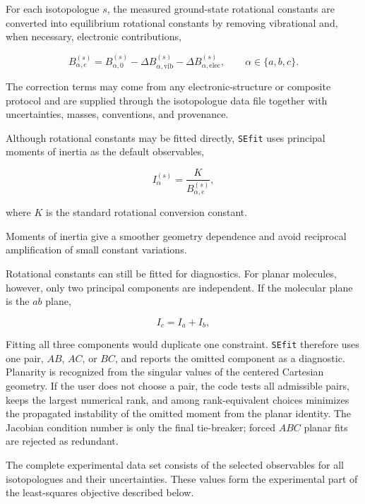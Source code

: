 \documentclass[journal=jctcce,manuscript=article,maxauthors=999]{achemso}
\begin{document}
For each isotopologue $s$, the measured ground-state rotational constants are
converted into equilibrium rotational constants by removing vibrational and,
when necessary, electronic contributions,\cite{Costain1958,Pawlowski2002,Piccardo2015B3LYP,Penocchio2015B2PLYP}

\begin{equation}
B_{\alpha,e}^{(s)}
= B_{\alpha,0}^{(s)}
- \Delta B_{\alpha,\mathrm{vib}}^{(s)}
- \Delta B_{\alpha,\mathrm{elec}}^{(s)},
\qquad
\alpha \in \{a,b,c\}.
\end{equation}

The correction terms may come from any electronic-structure or composite
protocol and are supplied through the isotopologue data file together with
uncertainties, masses, conventions, and provenance.\cite{Mendolicchio2025FastDvib}

Although rotational constants may be fitted directly, \texttt{SEfit} uses
principal moments of inertia as the default observables,

\begin{equation}
I_{\alpha}^{(s)}
=
\frac{K}
{B_{\alpha,e}^{(s)}},
\end{equation}

where $K$ is the standard rotational conversion constant.

Moments of inertia give a smoother geometry dependence and avoid reciprocal
amplification of small constant variations.

Rotational constants can still be fitted for diagnostics. For planar
molecules, however, only two principal components are independent. If the
molecular plane is the $ab$ plane,

\begin{equation}
I_c = I_a + I_b ,
\end{equation}

Fitting all three components would duplicate one constraint. \texttt{SEfit}
therefore uses one pair, $AB$, $AC$, or $BC$, and reports the omitted
component as a diagnostic. Planarity is recognized from the singular values of
the centered Cartesian geometry. If the user does not choose a pair, the code
tests all admissible pairs, keeps the largest numerical rank, and among
rank-equivalent choices minimizes the propagated instability of the omitted
moment from the planar identity. The Jacobian condition number is only the
final tie-breaker; forced $ABC$ planar fits are rejected as redundant.

The complete experimental data set consists of the selected observables for all
isotopologues and their uncertainties. These values form the experimental part
of the least-squares objective described below.
\end{document}
